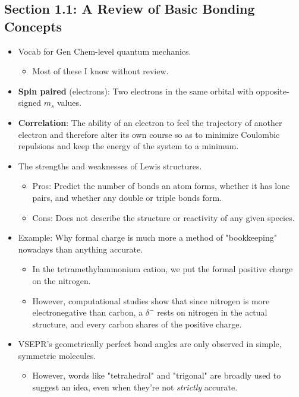 \documentclass[../notes.tex]{subfiles}
\begin{document}
\subsection*{Section 1.1: A Review of Basic Bonding Concepts}
\begin{itemize}
    \item Vocab for Gen Chem-level quantum mechanics.
    \begin{itemize}
        \item Most of these I know without review.
    \end{itemize}
    \item \textbf{Spin paired} (electrons): Two electrons in the same orbital with opposite-signed $m_s$ values.
    \item \textbf{Correlation}: The ability of an electron to feel the trajectory of another electron and therefore alter its own course so as to minimize Coulombic repulsions and keep the energy of the system to a minimum.
    \item The strengths and weaknesses of Lewis structures.
    \begin{itemize}
        \item Pros: Predict the number of bonds an atom forms, whether it has lone pairs, and whether any double or triple bonds form.
        \item Cons: Does not describe the structure or reactivity of any given species.
    \end{itemize}
    \item Example: Why formal charge is much more a method of "bookkeeping" nowadays than anything accurate.
    \begin{itemize}
        \item In the tetramethylammonium cation, we put the formal positive charge on the nitrogen.
        \item However, computational studies show that since nitrogen is more electronegative than carbon, a $\delta^-$ rests on nitrogen in the actual structure, and every carbon shares  of the positive charge.
    \end{itemize}
    \item VSEPR's geometrically perfect bond angles are only observed in simple, symmetric molecules.
    \begin{itemize}
        \item However, words like "tetrahedral" and "trigonal" are broadly used to suggest an idea, even when they're not \emph{strictly} accurate.
    \end{itemize}

\end{itemize}
\end{document}

